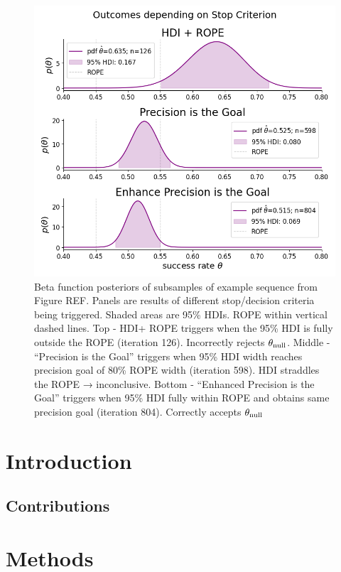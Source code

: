 \documentclass{article}
\begin{document}
\begin{figure}[h]
    \centering
    \includegraphics[width=1\textwidth]{cherry_posteriors.png}
    \caption{Beta function posteriors of subsamples of example sequence from Figure REF. Panels are results of different stop/decision criteria being triggered. Shaded areas are 95\% HDIs. ROPE within vertical dashed lines.
    Top - HDI+ ROPE triggers when the 95\% HDI is fully outside the ROPE (iteration 126). Incorrectly rejects $\theta_{\rm null}$. Middle - “Precision is the Goal” triggers when 95\% HDI width reaches precision goal of 80\% ROPE width (iteration 598). HDI straddles the ROPE → inconclusive.
    Bottom - “Enhanced Precision is the Goal” triggers when 95\% HDI fully within ROPE and obtains same precision goal (iteration 804). Correctly accepts $\theta_{\rm null}$}
\end{figure}

\section{Introduction}


\subsection{Contributions}
\section{Methods}
\end{document}
